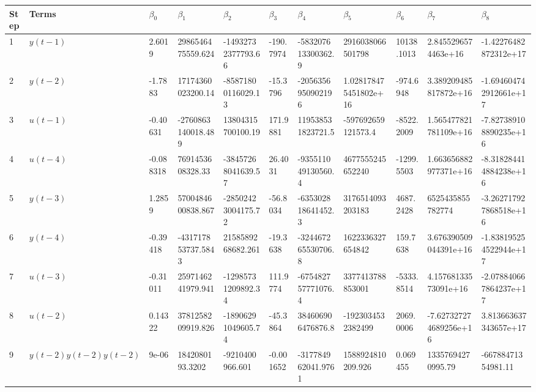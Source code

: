 \begin{tabular}{lllllllllll}
Step & Terms & $\beta_{0}$ & $\beta_{1}$ & $\beta_{2}$ & $\beta_{3}$ & $\beta_{4}$ & $\beta_{5}$ & $\beta_{6}$ & $\beta_{7}$ & $\beta_{8}$ \\ 
\hline 
1 & $y(t-1)$ & 2.6019 & 2986546475559.624 & -14932732377793.66 & -190.7974 & -583207613300362.9 & 2916038066501798 & 10138.1013 & 2.8455296574463e+16 & -1.42276482872312e+17 \\ 
2 & $y(t-2)$ & -1.7883 & 17174360023200.14 & -85871800116029.13 & -15.3796 & -2056356950902196 & 1.028178475451802e+16 & -974.6948 & 3.389209485817872e+16 & -1.694604742912661e+17 \\ 
3 & $u(t-1)$ & -0.40631 & -2760863140018.489 & 13804315700100.19 & 171.9881 & 119538531823721.5 & -597692659121573.4 & -8522.2009 & 1.565477821781109e+16 & -7.827389108890235e+16 \\ 
4 & $u(t-4)$ & -0.088318 & 7691453608328.33 & -38457268041639.57 & 26.4031 & -935511049130560.4 & 4677555245652240 & -1299.5503 & 1.663656882977371e+16 & -8.318284414884238e+16 \\ 
5 & $y(t-3)$ & 1.2859 & 5700484600838.867 & -28502423004175.72 & -56.8034 & -635302818641452.3 & 3176514093203183 & 4687.2428 & 6525435855782774 & -3.262717927868518e+16 \\ 
6 & $y(t-4)$ & -0.39418 & -431717853737.5843 & 2158589268682.261 & -19.3638 & -324467265530706.8 & 1622336327654842 & 159.7638 & 3.676390509044391e+16 & -1.838195254522944e+17 \\ 
7 & $u(t-3)$ & -0.31011 & 2597146241979.941 & -12985731209892.34 & 111.9774 & -675482757771076.4 & 3377413788853001 & -5333.8514 & 4.15768133573091e+16 & -2.078840667864237e+17 \\ 
8 & $u(t-2)$ & 0.14322 & 3781258209919.826 & -18906291049605.74 & -45.3864 & 384606906476876.8 & -1923034532382499 & 2069.0006 & -7.627327274689256e+16 & 3.813663637343657e+17 \\ 
9 & $y(t-2)y(t-2)y(t-2)$ & 9e-06 & 1842080193.3202 & -9210400966.601 & -0.001652 & -317784962041.9761 & 1588924810209.926 & 0.069455 & 13357694270995.79 & -66788471354981.11 \\ 
\hline 
\end{tabular}